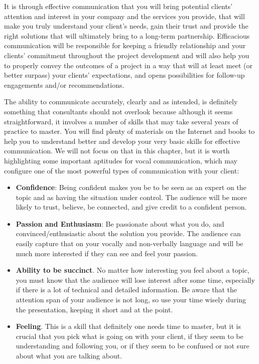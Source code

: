 \documentclass[
]{krantz}
\providecommand{\tightlist}{%
  \setlength{\itemsep}{0pt}\setlength{\parskip}{0pt}}
\begin{document}
It is through effective communication that you will bring potential clients' attention and interest in your company and the services you provide, that will make you truly understand your client's needs, gain their trust and provide the right solutions that will ultimately bring to a long-term partnership. Efficacious communication will be responsible for keeping a friendly relationship and your clients' commitment throughout the project development and will also help you to properly convey the outcomes of a project in a way that will at least meet (or better surpass) your clients' expectations, and opens possibilities for follow-up engagements and/or recommendations.

The ability to communicate accurately, clearly and as intended, is definitely something that consultants should not overlook because although it seems straightforward, it involves a number of skills that may take several years of practice to master. You will find plenty of materials on the Internet and books to help you to understand better and develop your very basic skills for effective communication. We will not focus on that in this chapter, but it is worth highlighting some important aptitudes for vocal communication, which may configure one of the most powerful types of communication with your client:

\begin{itemize}
\tightlist
\item
  \textbf{Confidence}: Being confident makes you be to be seen as an expert on the topic and as having the situation under control. The audience will be more likely to trust, believe, be connected, and give credit to a confident person.
\item
  \textbf{Passion and Enthusiasm}: Be passionate about what you do, and convinced/enthusiastic about the solution you provide. The audience can easily capture that on your vocally and non-verbally language and will be much more interested if they can see and feel your passion.
\item
  \textbf{Ability to be succinct}. No matter how interesting you feel about a topic, you must know that the audience will lose interest after some time, especially if there is a lot of technical and detailed information. Be aware that the attention span of your audience is not long, so use your time wisely during the presentation, keeping it short and at the point.
\item
  \textbf{Feeling}. This is a skill that definitely one needs time to master, but it is crucial that you pick what is going on with your client, if they seem to be understanding and following you, or if they seem to be confused or not sure about what you are talking about.
\end{itemize}
\end{document}
